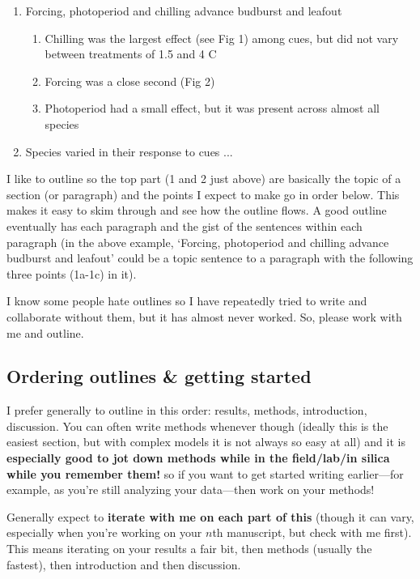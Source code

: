 \documentclass[11pt,letter]{article}
\begin{document}
\begin{enumerate}
\item Forcing, photoperiod and chilling advance budburst and leafout
\begin{enumerate}
\item Chilling was the largest effect (see Fig 1) among cues, but did not vary between treatments of 1.5 and 4 C
\item Forcing was a close second (Fig 2)
\item Photoperiod had a small effect, but it was present across almost all species
\end{enumerate}
\item Species varied in their response to cues ... 
\end{enumerate}

I like to outline so the top part (1 and 2 just above) are basically the topic of a section (or paragraph) and the points I expect to make go in order below. This makes it easy to skim through and see how the outline flows. A good outline eventually has each paragraph and the gist of the sentences within each paragraph (in the above example, `Forcing, photoperiod and chilling advance budburst and leafout' could be a topic sentence to a paragraph with the following three points (1a-1c) in it). 

I know some people hate outlines so I have repeatedly tried to write and collaborate without them, but it has almost never worked. So, please work with me and outline. 

\subsection{Ordering outlines \& getting started}
I prefer generally to outline in this order: results, methods, introduction, discussion. You can often write methods whenever though (ideally this is the easiest section, but with complex models it is not always so easy at all) and it is {\bf especially good to jot down methods while in the field/lab/in silica while you remember them!} so if you want to get started writing earlier---for example, as you're still analyzing your data---then work on your methods! 

Generally expect to {\bf iterate with me on each part of this} (though it can vary, especially when you're working on your $n$th manuscript, but check with me first). This means iterating on your results a fair bit, then methods (usually the fastest), then introduction and then discussion. 
\end{document}
